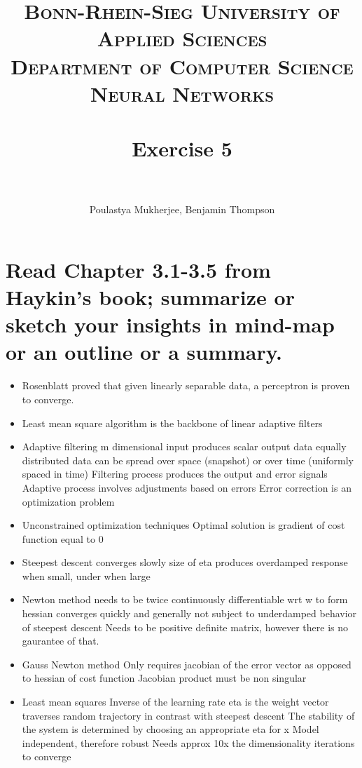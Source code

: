 \documentclass[paper=a4, fontsize=11pt]{scrartcl} %
\title{	
\normalfont \normalsize 
\textsc{Bonn-Rhein-Sieg University of Applied Sciences \\Department of Computer Science\\Neural Networks} \\ [10pt] %
\horrule{0.5pt} \\[0.4cm] %
\LARGE  Exercise 5\\ %
\horrule{2pt} \\[0.5cm] %
}
\date{}
\author{Poulastya Mukherjee, Benjamin Thompson} %
\begin{document}
\maketitle %


\section{Read Chapter 3.1-3.5 from Haykin's book; summarize or sketch your insights in mind-map or
an outline or a summary.}

\begin{itemize}
\item Rosenblatt proved that given linearly separable data, a perceptron is proven to converge.
\item Least mean square algorithm is the backbone of linear adaptive filters
\item Adaptive filtering
\subitem m dimensional input produces scalar output
\subitem data equally distributed
\subitem data can be spread over space (snapshot) or over time (uniformly spaced in time)
\subitem Filtering process produces the output and error signals
\subitem Adaptive process involves adjustments based on errors
\subitem Error correction is an optimization problem
\item Unconstrained optimization techniques
\subitem Optimal solution is gradient of cost function equal to 0
\item Steepest descent
\subitem converges slowly
\subitem size of eta produces overdamped response when small, under when large
\item Newton method
\subitem needs to be twice continuously differentiable wrt w to form hessian
\subitem converges quickly and generally not subject to underdamped behavior of steepest descent
\subitem Needs to be positive definite matrix, however there is no gaurantee of that.
\item Gauss Newton method
\subitem Only requires jacobian of the error vector as opposed to hessian of cost function
\subitem Jacobian product must be non singular
\item Least mean squares
\subitem Inverse of the learning rate eta is the 
\subitem weight vector traverses random trajectory in contrast with steepest descent
\subitem The stability of the system is determined by choosing an appropriate eta for x
\subitem Model independent, therefore robust
\subitem Needs approx 10x the dimensionality iterations to converge
\end{itemize}
\end{document}
